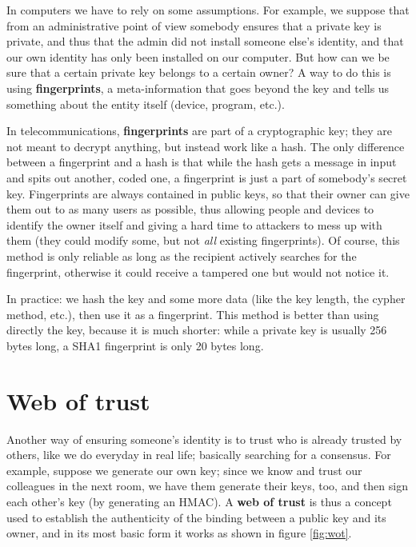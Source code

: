 In computers we have to rely on some assumptions. For example, we suppose that from an administrative point of view somebody ensures that a private key is private, and thus that the admin did not install someone else's identity, and that our own identity has only been installed on our computer. But how can we be sure that a certain private key belongs to a certain owner? A way to do this is using \textbf{fingerprints}, a meta-information that goes beyond the key and tells us something about the entity itself (device, program, etc.).

In telecommunications, \textbf{fingerprints} are part of a cryptographic key; they are not meant to decrypt anything, but instead work like a hash. The only difference between a fingerprint and a hash is that while the hash gets a message in input and spits out another, coded one, a fingerprint is just a part of somebody's secret key. Fingerprints are always contained in public keys, so that their owner can give them out to as many users as possible, thus allowing people and devices to identify the owner itself and giving a hard time to attackers to mess up with them (they could modify some, but not \textit{all} existing fingerprints). Of course, this method is only reliable as long as the recipient actively searches for the fingerprint, otherwise it could receive a tampered one but would not notice it.

In practice: we hash the key and some more data (like the key length, the cypher method, etc.), then use it as a fingerprint. This method is better than using directly the key, because it is much shorter: while a private key is usually 256 bytes long, a SHA1 fingerprint is only 20 bytes long.


\section{Web of trust}
Another way of ensuring someone's identity is to trust who is already trusted by others, like we do everyday in real life; basically searching for a consensus. For example, suppose we generate our own key; since we know and trust our colleagues in the next room, we have them generate their keys, too, and then sign each other's key (by generating an HMAC). A \textbf{web of trust} is thus a concept used to establish the authenticity of the binding between a public key and its owner, and in its most basic form it works as shown in figure \ref{fig:wot}.

